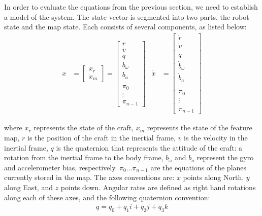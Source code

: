\documentclass[]{article}
\begin{document}
{In order to evaluate the equations from the previous section, we need to establish a model of the system. The state vector is segmented into two parts, the robot state and the map state. Each consists of several components, as listed below:
\begin{align}
	\label{eqn:state}
	x &=
	\left[
	\begin{matrix}
		x_r \\
		x_m
	\end{matrix}
	\right]
	=
	\left[
	\begin{matrix}
		r \\
		v \\
		q \\
		b_\omega \\
		b_a \\
		\\
		\pi_0 \\
		\vdots \\
		\pi_{n-1}
	\end{matrix}
	\right]
	&
	\dot{x} &= 
	\left[
	\begin{matrix}
		\dot{r} \\
		\dot{v} \\
		\dot{q} \\
		\dot{b}_\omega \\
		\dot{b}_a \\
		\\
		\dot{\pi}_0 \\
		\vdots \\
		\dot{\pi}_{n-1}
	\end{matrix}
	\right]
\end{align}

where $x_r$ represents the state of the craft, $x_m$ represents the state of the feature map, $r$ is the position of the craft in the inertial frame, $v$ is the velocity in the inertial frame, $q$ is the quaternion that represents the attitude of the craft: a rotation from the inertial frame to the body frame, $b_\omega$ and $b_a$ represent the gyro and accelerometer bias, respectively. $\pi_0 \hdots \pi_{n-1}$ are the equations of the planes currently stored in the map. The axes conventions are: $x$ points along North, $y$ along East, and $z$ points down. Angular rates are defined as right hand rotations along each of these axes, and the following quaternion convention:
\begin{align}
	\label{eqn:quaternion_components}
	q = q_0 + q_1i + q_2j + q_3k
\end{align}

}
\end{document}
